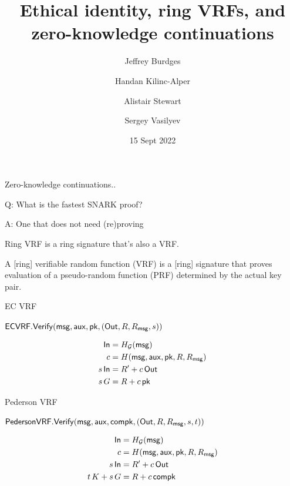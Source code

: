 \documentclass{beamer}
\title{Ethical identity, ring VRFs, and \\ zero-knowledge continuations}
\author{Jeffrey Burdges \and Handan Kilinc-Alper \and Alistair Stewart \and Sergey Vasilyev}
\date{15 Sept 2022}
\def\compk{\ensuremath{\mathsf{compk}}\xspace}
\begin{document}
\maketitle


\begin{frame}

Zero-knowledge continuations..
	
\bigskip

Q: What is the fastest SNARK proof?

\bigskip

A: One that does not need (re)proving

\end{frame}



\begin{frame}

Ring VRF is a ring signature that's also a VRF.

\bigskip 

A [ring] verifiable random function (VRF) is a [ring] signature that proves evaluation of a pseudo-random function (PRF) determined by the actual key pair.


\end{frame}



\begin{frame}{EC VRF}

$\mathsf{ECVRF}.{\mathsf{Verify}}(\mathsf{msg},\mathsf{aux},\mathsf{pk},({\mathsf{Out}},R,R_\mathsf{msg},s))$

$$ \begin{aligned}
{\ensuremath{\mathsf{In}}} &= H_{\mathcal{G}}(\mathsf{msg}) \\
c &= H(\mathsf{msg},\mathsf{aux},\mathsf{pk},R,R_\mathsf{msg}) \\
s \, {\mathsf{In}} &= R' + c \, {\mathsf{Out}} \\
s \, G &= R + c \, \mathsf{pk} \\
\end{aligned} $$

\end{frame}



\begin{frame}{Pederson VRF}
	
$\mathsf{PedersonVRF}.\Verify(\msg,\aux,\compk,(\Out,R,R_\msg,s,t))$
	
$$ \begin{aligned}
\In &= H_{\mathcal{G}}(\msg) \\
c &= H(\msg,\aux,\pk,R,R_\msg) \\
s \, \In &= R' + c \, \Out \\
t \, K + s \, G &= R + c \, \compk \\
\end{aligned} $$
	
\end{frame}
\end{document}
